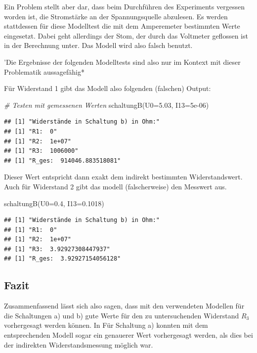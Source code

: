 \documentclass[
  9pt,
]{article}
\newenvironment{Shaded}{\begin{snugshade}}{\end{snugshade}}
\newcommand{\AttributeTok}[1]{\textcolor[rgb]{0.77,0.63,0.00}{#1}}
\newcommand{\CommentTok}[1]{\textcolor[rgb]{0.56,0.35,0.01}{\textit{#1}}}
\newcommand{\FloatTok}[1]{\textcolor[rgb]{0.00,0.00,0.81}{#1}}
\newcommand{\FunctionTok}[1]{\textcolor[rgb]{0.00,0.00,0.00}{#1}}
\newcommand{\NormalTok}[1]{#1}
\begin{document}
Ein Problem stellt aber dar, dass beim Durchführen des Experiments
vergessen worden ist, die Stromstärke an der Spannungsquelle abzulesen.
Es werden stattdessen für diese Modelltest die mit dem Amperemeter
bestimmten Werte eingesetzt. Dabei geht allerdings der Stom, der durch
das Voltmeter geflossen ist in der Berechnung unter. Das Modell wird
also falsch benutzt.

'Die Ergebnisse der folgenden Modelltests sind also nur im Kontext mit
dieser Problematik aussagefähig*

Für Widerstand 1 gibt das Modell also folgenden (falschen) Output:

\begin{Shaded}
\begin{Highlighting}[]
\CommentTok{\# Testen mit gemessenen Werten}
\FunctionTok{schaltungB}\NormalTok{(}\AttributeTok{U0=}\FloatTok{5.03}\NormalTok{, }\AttributeTok{I13=}\FloatTok{5e{-}06}\NormalTok{)}
\end{Highlighting}
\end{Shaded}

\begin{verbatim}
## [1] "Widerstände in Schaltung b) in Ohm:"
## [1] "R1:  0"
## [1] "R2:  1e+07"
## [1] "R3:  1006000"
## [1] "R_ges:  914046.883518081"
\end{verbatim}

Dieser Wert entspricht dann exakt dem indirekt bestimmten
Widerstandswert. Auch für Widerstand 2 gibt das modell (falscherweise)
den Messwert aus.

\begin{Shaded}
\begin{Highlighting}[]
\FunctionTok{schaltungB}\NormalTok{(}\AttributeTok{U0=}\FloatTok{0.4}\NormalTok{, }\AttributeTok{I13=}\FloatTok{0.1018}\NormalTok{)}
\end{Highlighting}
\end{Shaded}

\begin{verbatim}
## [1] "Widerstände in Schaltung b) in Ohm:"
## [1] "R1:  0"
## [1] "R2:  1e+07"
## [1] "R3:  3.92927308447937"
## [1] "R_ges:  3.92927154056128"
\end{verbatim}

\hypertarget{fazit}{%
\subsection{Fazit}\label{fazit}}

Zusammenfassend lässt sich also sagen, dass mit den verwendeten Modellen
für die Schaltungen a) und b) gute Werte für den zu untersuchenden
Widerstand \(R_3\) vorhergesagt werden können. In Für Schaltung a)
konnten mit dem entsprechenden Modell sogar ein genauerer Wert
vorhergesagt werden, als dies bei der indirekten Widerstandsmessung
möglich war.
\end{document}
